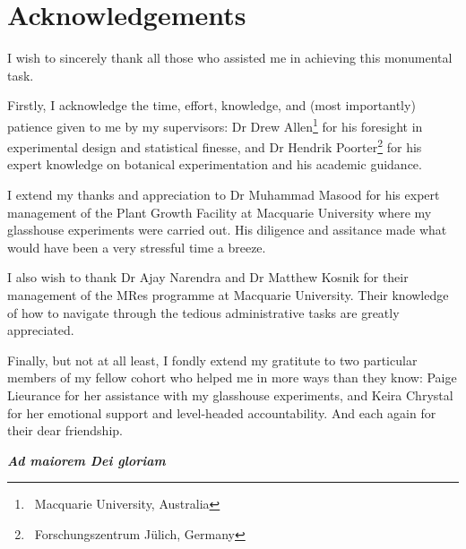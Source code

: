 \chapter*{Acknowledgements}
I wish to sincerely thank all those who assisted me in achieving this monumental task.

\vspace{1em}
Firstly, I acknowledge the time, effort, knowledge, and (most importantly) patience given to me by my supervisors: Dr Drew Allen\footnote{\label{MQ}\ Macquarie University, Australia} for his foresight in experimental design and statistical finesse, and Dr Hendrik Poorter\footnote{\label{Julich}\ Forschungszentrum Jülich, Germany} for his expert knowledge on botanical experimentation and his academic guidance.

\vspace{1em}
I extend my thanks and appreciation to Dr Muhammad Masood for his expert management of the Plant Growth Facility at Macquarie University where my glasshouse experiments were carried out. His diligence and assitance made what would have been a very stressful time a breeze.

\vspace{1em}
I also wish to thank Dr Ajay Narendra and Dr Matthew Kosnik for their management of the MRes programme at Macquarie University. Their knowledge of how to navigate through the tedious administrative tasks are greatly appreciated.

\vspace{1em}
Finally, but not at all least, I fondly extend my gratitute to two particular members of my fellow cohort who helped me in more ways than they know: Paige Lieurance for her assistance with my glasshouse experiments, and Keira Chrystal for her emotional support and level-headed accountability. And each again for their dear friendship.

\vspace{2em}
\begin{center}
  \Large
  \textbf{\textit{Ad maiorem Dei gloriam}}
\end{center}
